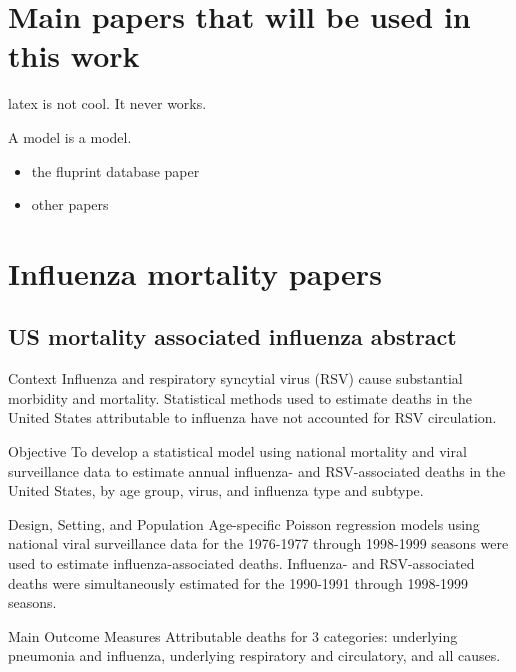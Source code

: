 



\makeglossaries




\tableofcontents
\printglossary[type=bus]
\printglossary[type=dm]

\section{Main papers that will be used in this work}

\Gls{latex} is not cool. It never works.

A \gls{model} is a model.

\begin{itemize}
    \item the fluprint database paper \cite{tomicFluPRINTDatasetMultidimensional2019}
    \item other papers
\end{itemize}

\section{Influenza mortality papers}

\subsection{US mortality associated influenza abstract}
\cite{thompsonMortalityAssociatedInfluenza2003}
Context  Influenza and respiratory syncytial virus (RSV) cause substantial
morbidity and mortality. Statistical methods used to estimate deaths in the
United States attributable to influenza have not accounted for RSV circulation.

Objective  To develop a statistical model using national mortality and viral
surveillance data to estimate annual influenza- and RSV-associated deaths in
the United States, by age group, virus, and influenza type and subtype.

Design, Setting, and Population  Age-specific Poisson regression models using
national viral surveillance data for the 1976-1977 through 1998-1999 seasons
were used to estimate influenza-associated deaths. Influenza- and
RSV-associated deaths were simultaneously estimated for the 1990-1991 through
1998-1999 seasons.

Main Outcome Measures  Attributable deaths for 3 categories: underlying
pneumonia and influenza, underlying respiratory and circulatory, and all
causes.

